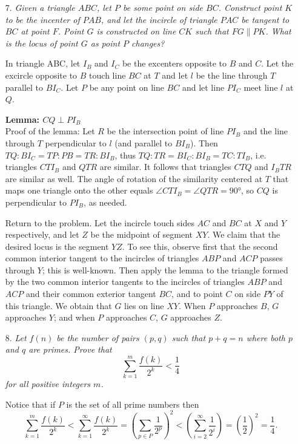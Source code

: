 \documentclass{article}
\begin{document}
\begin{enumerate}
\medskip
\item[7.] %
\textit{Given a triangle $ABC$, let $P$ be some point on side $BC$. Construct point $K$ to be the incenter of $PAB$, and let the incircle of triangle $PAC$ be tangent to $BC$ at point $F$. Point $G$ is constructed on line $CK$ such that $FG \parallel PK$. What is the locus of point $G$ as point $P$ changes?}

In triangle ABC, let $I_B$ and $I_C$ be the excenters opposite to $B$ and $C$. Let the excircle opposite to $B$ touch line $BC$ at $T$ and let $l$ be the line through $T$ parallel to $BI_C$. Let $P$ be any point on line $BC$ and let line $PI_C$ meet line $l$ at $Q$.

\textbf{Lemma: $CQ \perp PI_B$} \\
Proof of the lemma: Let $R$ be the intersection point of line $PI_B$ and the line through $T$ perpendicular to $l$ (and parallel to $BI_B$). 
Then $TQ : BI_C = TP : PB = TR : BI_B$, thus $TQ : TR = BI_C : BI_B = TC : TI_B$, i.e. triangles $CTI_B$ and $QTR$ are similar. It follows that triangles $CTQ$ and $I_BTR$ are similar as well. 
The angle of rotation of the similarity centered at $T$ that maps one triangle onto the other equals $\angle CTI_B = \angle QTR = 90 \si{\degree}$, so $CQ$ is perpendicular to $PI_B$, as needed.

Return to the problem. Let the incircle touch sides $AC$ and $BC$ at $X$ and $Y$ respectively, and let $Z$ be the midpoint of segment $XY$.
We claim that the desired locus is the segment $YZ$. To see this, observe first that the second common interior tangent to the incircles of triangles $ABP$ and $ACP$ passes through $Y$; this is well-known.
Then apply the lemma to the triangle formed by the two common interior tangents to the incircles of triangles $ABP$ and $ACP$ and their common
exterior tangent $BC$, and to point $C$ on side $PY$ of this triangle. 
We obtain that $G$ lies on line $XY$. When $P$ approaches $B$, $G$ approaches $Y$; and when $P$ approaches $C$, $G$ approaches $Z$.

\medskip
\item[8.] %
\textit{Let $f(n)$ be the number of pairs $(p, q)$ such that $p + q = n$ where both $p$ and $q$ are primes. Prove that
$$\sum_{k = 1}^{m} \frac{f(k)}{2^k} < \frac{1}{4}$$
for all positive integers $m$.}

Notice that if $P$ is the set of all prime numbers then
$$\sum_{k = 1}^{m} \frac{f(k)}{2^k} < \sum_{k = 1}^{\infty} \frac{f(k)}{2^k} = (\sum_{p \in P} \frac{1}{2^p})^2 < (\sum_{i = 2}^{\infty} \frac{1}{2^i}) = (\frac{1}{2})^2 = \frac{1}{4}.$$

\end{enumerate}
\end{document}
